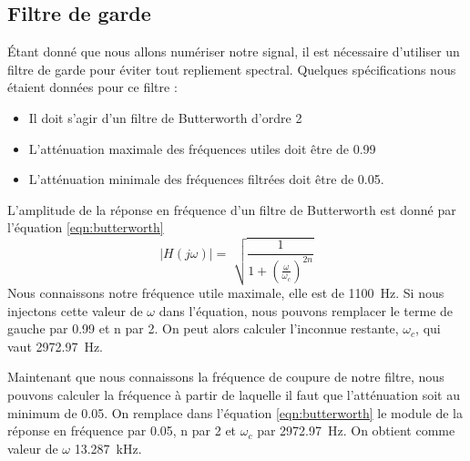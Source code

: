 \subsection{Filtre de garde}
Étant donné que nous allons numériser notre signal, il est nécessaire d'utiliser un filtre de garde pour éviter tout repliement spectral. Quelques spécifications nous étaient données pour ce filtre :
\begin{itemize}
\item Il doit s'agir d'un filtre de Butterworth d'ordre 2
\item L'atténuation maximale des fréquences utiles doit être de 0.99
\item L'atténuation minimale des fréquences filtrées doit être de 0.05.
\end{itemize}
L'amplitude de la réponse en fréquence d'un filtre de Butterworth est donné par l'équation \ref{eqn:butterworth}
\begin{equation}
\vert{H(j\omega)}\vert = \sqrt[]{\frac{1}{1+(\frac{\omega}{\omega_c})^{2n}}}
\label{eqn:butterworth}
\end{equation}
Nous connaissons notre fréquence utile maximale, elle est de \SI{1100}{\hertz}. Si nous injectons cette valeur de $\omega$ dans l'équation, nous pouvons remplacer le terme de gauche par 0.99 et n par 2. On peut alors calculer  l'inconnue restante, $\omega_c$, qui vaut \SI{2972.97}{\hertz}.

Maintenant que nous connaissons la fréquence de coupure de notre filtre, nous pouvons calculer la fréquence à partir de laquelle il faut que l'atténuation soit au minimum de 0.05. On remplace dans l'équation \ref{eqn:butterworth} le module de la réponse en fréquence par 0.05, n par 2 et $\omega_c$ par \SI{2972.97}{\hertz}. On obtient comme valeur de $\omega$ \SI{13.287}{\kilo\hertz}. 

